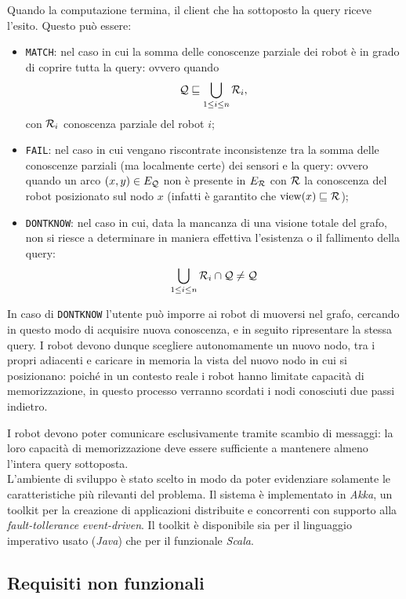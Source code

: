 Quando la computazione termina, il client che ha sottoposto la
query riceve l'esito. Questo può essere:
\begin{itemize}
\item \texttt{MATCH}: nel caso in cui la somma delle conoscenze
parziale dei robot è in grado di coprire tutta la query: ovvero quando \[
\mathcal{Q} \sqsubseteq \bigcup_{1 \leq i \leq n} \mathcal{R}_i, \]
con $\mathcal{R}_i$ conoscenza parziale del robot $i$;
\item \texttt{FAIL}: nel caso in cui vengano riscontrate inconsistenze
tra la somma delle conoscenze parziali (ma localmente certe)
dei sensori e la query: ovvero quando un arco $(x, y) \in E_{\mathcal{Q}}$
non è presente in $E_{\mathcal{R}}$ con $\mathcal{R}$ la conoscenza del robot posizionato
sul nodo $x$ (infatti è garantito che $\mathrm{view}(x) \sqsubseteq \mathcal{R}$);
\item \texttt{DONTKNOW}: nel caso in cui, data la mancanza di una visione
totale del grafo, non si riesce a determinare in maniera effettiva
l'esistenza o il fallimento della query:\[
\bigcup_{1 \leq i \leq n} \mathcal{R}_i \cap \mathcal{Q} \neq \mathcal{Q}
\]
\end{itemize}

In caso di \texttt{DONTKNOW} l'utente può imporre ai robot di muoversi
nel grafo, cercando in questo modo di acquisire nuova conoscenza,
e in seguito ripresentare la stessa query.
I robot devono dunque scegliere autonomamente un nuovo nodo,
tra i propri adiacenti e caricare in memoria la vista del nuovo
nodo in cui si posizionano: poiché in un contesto reale i
robot hanno limitate capacità di memorizzazione,
in questo processo verranno scordati i nodi conosciuti due
passi indietro.

I robot devono poter comunicare esclusivamente tramite scambio di
messaggi: la loro capacità di memorizzazione deve essere sufficiente
a mantenere almeno l'intera query sottoposta.\\

L'ambiente di sviluppo è stato scelto in modo da poter
evidenziare solamente le caratteristiche più rilevanti del problema.
Il sistema è implementato in \emph{Akka}, un toolkit per
la creazione di applicazioni distribuite e concorrenti con supporto
alla \emph{fault-tollerance event-driven}.
Il toolkit è disponibile sia per il linguaggio imperativo usato (\emph{Java})
che per il funzionale \emph{Scala}.

\subsection{Requisiti non funzionali}
\label{sec:nonfunc-req}

